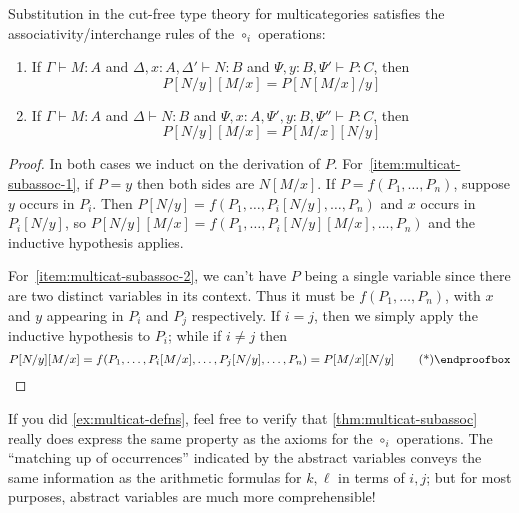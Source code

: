 \documentclass{book}
\let\types\vdash
\begin{document}
\begin{thm}\label{thm:multicat-subassoc}
  Substitution in the cut-free type theory for multicategories satisfies the associativity/interchange rules of the $\circ_i$ operations:
  \begin{enumerate}
  \item If $\Gamma\types M:A$ and $\Delta,x:A,\Delta' \types N:B$ and $\Psi,y:B,\Psi'\types P:C$, then\label{item:multicat-subassoc-1}
    \[ P[N/y][M/x] = P[N[M/x]/y] \]
  \item If $\Gamma\types M:A$ and $\Delta \types N:B$ and $\Psi,x:A,\Psi',y:B,\Psi''\types P:C$, then\label{item:multicat-subassoc-2}
    \[ P[N/y][M/x] = P[M/x][N/y] \]
  \end{enumerate}
\end{thm}
\begin{proof}
  In both cases we induct on the derivation of $P$.
  For~\ref{item:multicat-subassoc-1}, if $P=y$ then both sides are $N[M/x]$.
  If $P=f(P_1,\dots,P_n)$, suppose $y$ occurs in $P_i$.
  Then $P[N/y] = f(P_1,\dots,P_i[N/y],\dots,P_n)$ and $x$ occurs in $P_i[N/y]$, so
  $P[N/y][M/x] = f(P_1,\dots,P_i[N/y][M/x],\dots,P_n)$ and the inductive hypothesis applies.

  For~\ref{item:multicat-subassoc-2}, we can't have $P$ being a single variable since there are two distinct variables in its context.
  Thus it must be $f(P_1,\dots,P_n)$, with $x$ and $y$ appearing in $P_i$ and $P_j$ respectively.
  If $i=j$, then we simply apply the inductive hypothesis to $P_i$; while if $i\neq j$ then
  \begin{equation*}
    P[N/y][M/x] = f(P_1,\dots,P_i[M/x],\dots,P_j[N/y],\dots,P_n) = P[M/x][N/y]\qedhere
  \end{equation*}
\end{proof}

If you did \cref{ex:multicat-defns}, feel free to verify that \cref{thm:multicat-subassoc} really does express the same property as the axioms for the $\circ_i$ operations.
The ``matching up of occurrences'' indicated by the abstract variables conveys the same information as the arithmetic formulas for $k,\ell$ in terms of $i,j$; but for most purposes, abstract variables are much more comprehensible!
\end{document}

